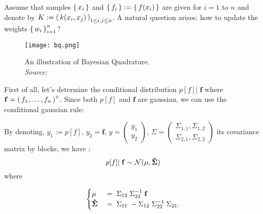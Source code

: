Assume that samples $\left \{ \, x_i \, \right \}$ and $\left \{ \, f_i \, \right \} := \left \{ \, f(x_i) \, \right \}$ are given for $i=1$ to $n$ and denote by $K:= \left( \, k(x_i, x_j) \, \right)_{1 \leq i,j \leq n}$. A natural question arises: how to update the weights $\left \{ \, w_i \, \right \}_{i=1}^n $?

\begin{figure}[H]
\centering
\texttt{[image: bq.png]}
\caption{An illustration of Bayesian Quadrature.\\\textit{Source:} \cite{huszar}}
\label{fig:bq}
\end{figure}

First of all, let's determine the conditional distribution $\displaystyle
 p[f]| \; \mathbf{f}$ where
$\mathbf{f} = \left( \, f_1, \ldots, f_n \, \right)^{\scriptscriptstyle T}$.
Since both $p[f]$ and $\mathbf{f}$ are gaussian, we can use the conditional gaussian rule:
\begin{boxdefinition}
  By denoting, $y_1 := p[f]$, $y_2 = \mathbf{f}$, $y = \begin{pmatrix}
    y_1\\y_2
\end{pmatrix}$, $\displaystyle \Sigma = \begin{pmatrix}
  \Sigma_{1,1}, \Sigma_{1,2}\\
  \Sigma_{2,1}, \Sigma_{2,2}
\end{pmatrix}$ its covariance matrix by blocks, we have :
$$p[f]| \; \mathbf{f} \sim \mathcal { N } (  \mu  , \mathbf{\tilde{\Sigma}} )$$
where


  \begin{equation*}
  \begin{cases}
    \mu \;&= \;  \Sigma _ { 12 } \; \Sigma _ { 22 } ^ { - 1 } \; \mathbf{f} \\
     \mathbf{\tilde{\Sigma}} \; &= \;  \Sigma _ { 11 } \;- \Sigma _ { 12 } \;\Sigma _ { 22 } ^ { - 1 } \; \Sigma _ { 21 }.
  \end{cases}
\end{equation*}
\end{boxdefinition}


